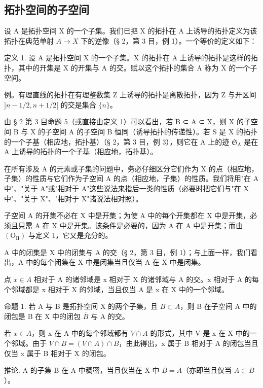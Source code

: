 \subsection{拓扑空间的子空间}

设 A 是拓扑空间 X 的一个子集。我们已把 X 的拓扑在 A 上诱导的拓扑定义为该拓扑在典范单射 \(A \rightarrow X\) 下的逆像（§ 2，第 3 目，例 1）。一个等价的定义如下：

定义 1. 设 A 是拓扑空间 X 的一个子集。X 的拓扑在 A 上诱导的拓扑是这样的拓扑，其中的开集是 X 的开集与 A 的交。赋以这个拓扑的集合 A 称为 X 的一个子空间。

例。有理直线的拓扑在有理整数集 Z 上诱导的拓扑是离散拓扑，因为 Z 与开区间 \(]n - 1/2, n + 1/2[\) 的交是集合 \(\{n\}\)。

由 § 2 第 3 目命题 5（或直接由定义 1）可以看出，若 B ⊂ A ⊂ X，则 X 的子空间 B 与 X 的子空间 A 的子空间 B 恒同（诱导拓扑的传递性）。若 S 是 X 的拓扑的一个子基（相应地，拓扑基）（§ 2，第 3 目，例 3），则它在 A 上的迹 \(\mathfrak{S}_{\mathrm{A}}\) 是在 A 上诱导的拓扑的一个子基（相应地，拓扑基）。

在所有涉及 A 的元素或子集的问题中，务必仔细区分它们作为 X 的点（相应地，子集）的性质与它们作为子空间 A 的点（相应地，子集）的性质。我们将用"在 A 中"、"关于 A"或"相对于 A"这些说法来指后一类的性质（必要时把它们与"在 X 中"、"关于 X"、"相对于 X"诸说法相对照）。

子空间 A 的开集不必在 X 中是开集；为使 A 中的每个开集都在 X 中是开集，必须且只需 A 在 X 中是开集。该条件是必要的，因为 A 在 A 中是开集；而由 \((\mathrm{O}_{\mathrm{II}})\) 与定义 1，它又是充分的。

A 中的闭集是 X 中的闭集与 A 的交（§ 2，第 3 目，例 1）；与上面一样，我们看出，A 中的每个闭集在 X 中是闭集当且仅当 A 在 X 中是闭集。

点 \(x \in A\) 相对于 A 的诸邻域是 x 相对于 X 的诸邻域与 A 的交。x 相对于 A 的每个邻域都是 x 相对于 X 的邻域，当且仅当 A 是 x 在 X 中的一个邻域。

命题 1. 若 A 与 B 是拓扑空间 X 的两个子集，且 \(B \subset A\)，则 B 在子空间 A 中的闭包是 B 在 X 中的闭包 \(\overline{B}\) 与 A 的交。

若 \(x \in A\)，则 x 在 A 中的每个邻域都有 \(V \cap A\) 的形式，其中 V 是 x 在 X 中的一个邻域。由于 \(V \cap B = (V \cap A) \cap B\)，由此得出，x 属于 B 相对于 A 的闭包当且仅当 x 属于 B 相对于 X 的闭包。

推论. A 的子集 B 在 A 中稠密，当且仅当在 X 中 \(\overline{B} = \overline{A}\)（亦即当且仅当 \(A \subset \overline{B}\)）。

